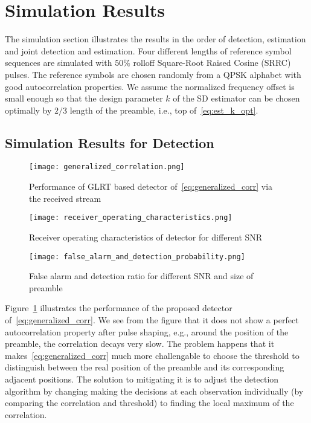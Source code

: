 \section{Simulation Results}%
\label{sec:simulations}

The simulation section illustrates the results in the order of detection, estimation and joint detection and estimation.
Four different lengths of reference symbol sequences are simulated with $50\%$ rolloff Square-Root Raised Cosine (SRRC) pulses.
The reference symbols are chosen randomly from a QPSK alphabet with good autocorrelation properties.
We assume the normalized frequency offset is small enough so that the design parameter $k$ of the SD estimator
can be chosen optimally by $2/3$ length of the preamble, i.e., top of~\eqref{eq:est_k_opt}. 

\subsection{Simulation Results for Detection}

\begin{figure}[t]
    \centerline{\texttt{[image: generalized\_correlation.png]}}
    \caption{Performance of GLRT based detector of~\eqref{eq:generalized_corr} via the received stream}
    \label{fig:Generalized correlation}
    \end{figure}

\begin{figure}[t]
    \centerline{\texttt{[image: receiver\_operating\_characteristics.png]}}
    \caption{Receiver operating characteristics of detector for different SNR}
    \label{fig:Receiver operating characteristics}
    \end{figure}

\begin{figure}[t]
    \centerline{\texttt{[image: false\_alarm\_and\_detection\_probability.png]}}
    \caption{False alarm and detection ratio for different SNR and size of preamble}
    \label{fig:False alarm and detection}
    \end{figure}

Figure~\ref{fig:Generalized correlation} illustrates the performance of the proposed detector of~\eqref{eq:generalized_corr}. 
We see from the figure that it does not show a perfect autocorrelation property after pulse shaping, e.g., around the position of the preamble, 
the correlation decays very slow. The problem happens that it makes~\eqref{eq:generalized_corr} much more challengable to choose the threshold to 
distinguish between the real position of the preamble and its corresponding adjacent positions. The solution to mitigating it is to 
adjust the detection algorithm by changing making the decisions at each observation individually (by comparing the correlation and threshold) to
finding the local maximum of the correlation.

